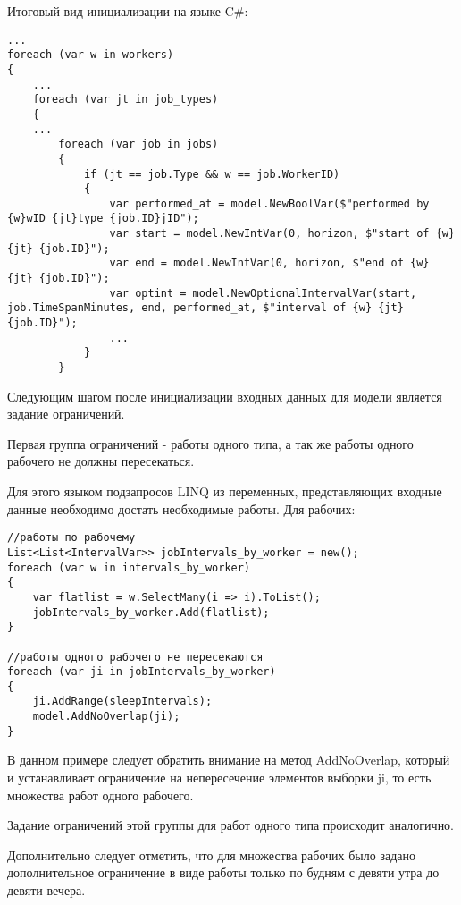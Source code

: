 Итоговый вид инициализации на языке C\#:

\begin{verbatim}
...
foreach (var w in workers)
{
    ...
    foreach (var jt in job_types)
    {
    ...
        foreach (var job in jobs)
        {
            if (jt == job.Type && w == job.WorkerID)
            {
                var performed_at = model.NewBoolVar($"performed by {w}wID {jt}type {job.ID}jID");
                var start = model.NewIntVar(0, horizon, $"start of {w} {jt} {job.ID}");
                var end = model.NewIntVar(0, horizon, $"end of {w} {jt} {job.ID}");
                var optint = model.NewOptionalIntervalVar(start, job.TimeSpanMinutes, end, performed_at, $"interval of {w} {jt} {job.ID}");
                ...
            }
        }
\end{verbatim}

Следующим шагом после инициализации входных данных для модели является задание ограничений.

Первая группа ограничений - работы одного типа, а так же работы одного рабочего не должны пересекаться.

Для этого языком подзапросов LINQ из переменных, представляющих входные данные необходимо достать необходимые работы. Для рабочих:
\begin{verbatim}
//работы по рабочему
List<List<IntervalVar>> jobIntervals_by_worker = new();
foreach (var w in intervals_by_worker)
{
    var flatlist = w.SelectMany(i => i).ToList();
    jobIntervals_by_worker.Add(flatlist);
}

//работы одного рабочего не пересекаются
foreach (var ji in jobIntervals_by_worker)
{
    ji.AddRange(sleepIntervals);
    model.AddNoOverlap(ji);
}
\end{verbatim}

В данном примере следует обратить внимание на метод AddNoOverlap, который и устанавливает ограничение на непересечение элементов выборки ji, то есть множества работ одного рабочего.

Задание ограничений этой группы для работ одного типа происходит аналогично.

Дополнительно следует отметить, что для множества рабочих было задано дополнительное ограничение в виде работы только по будням с девяти утра до девяти вечера.

